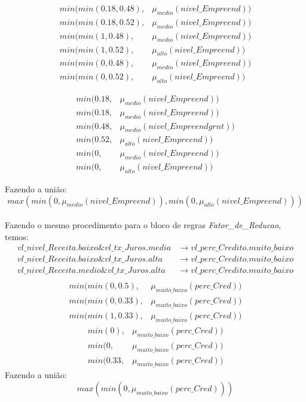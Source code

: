 \documentclass[12pt]{article}
\begin{document}
\begin{align*}
	min(min(0.18,0.48),&\mu_{medio}(nivel\_Empreend))\\
	min(min(0.18,0.52),&\mu_{medio}(nivel\_Empreend))\\
	min(min(1,0.48),&\mu_{medio}(nivel\_Empreend))\\
	min(min(1,0.52),&\mu_{alto}(nivel\_Empreend))\\
	min(min(0,0.48),&\mu_{medio}(nivel\_Empreend))\\
	min(min(0,0.52),&\mu_{alto}(nivel\_Empreend))
\end{align*}

\begin{align*}
	min(0.18,&\mu_{medio}(nivel\_Empreend))\\
	min(0.18,&\mu_{medio}(nivel\_Empreend))\\
	min(0.48,&\mu_{medio}(nivel\_Empreendgrnt))\\
	min(0.52,&\mu_{alto}(nivel\_Empreend))\\
	min(0,&\mu_{medio}(nivel\_Empreend))\\
	min(0,&\mu_{alto}(nivel\_Empreend))
\end{align*}

Fazendo a união:
\begin{equation}\label{eq:uniaoRegrasEmpreend}
	max(min(0,\mu_{medio}(nivel\_Empreend)),min(0,\mu_{alto}(nivel\_Empreend)))
\end{equation}\\

Fazendo o mesmo procedimento para o bloco de regras \textit{Fator\_de\_Reducao}, temos:
\begin{align*}
	vl\_nivel\_Receita.baixo\&vl\_tx\_Juros.media&\to vl\_perc\_Credito.muito\_baixo\\
	vl\_nivel\_Receita.baixo\&vl\_tx\_Juros.alta&\to vl\_perc\_Credito.muito\_baixo\\
	vl\_nivel\_Receita.medio\&vl\_tx\_Juros.alta&\to vl\_perc\_Credito.muito\_baixo\\
\end{align*}
\begin{align*}
	min(min(0,0.5),&\mu_{muito\_baixo}(perc\_Cred))\\
	min(min(0,0.33),&\mu_{muito\_baixo}(perc\_Cred))\\
	min(min(1,0.33),&\mu_{muito\_baixo}(perc\_Cred))
\end{align*}
\begin{align*}
	min(0),&\mu_{muito\_baixo}(perc\_Cred))\\
	min(0,&\mu_{muito\_baixo}(perc\_Cred))\\
	min(0.33,&\mu_{muito\_baixo}(perc\_Cred))
\end{align*}
Fazendo a união:
\begin{equation}\label{eq:uniaoRegrasPerceqCred}
	max(min(0,\mu_{muito\_baixo}(perc\_Cred)))
\end{equation}\\
\end{document}
